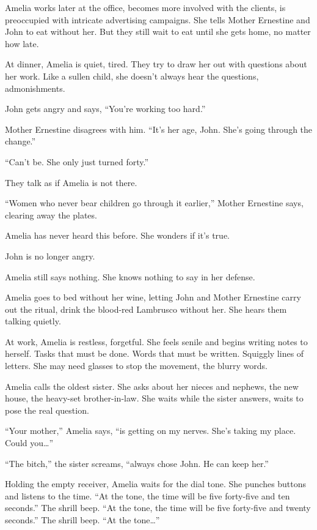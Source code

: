 \documentclass[twoside,10pt]{book}
\begin{document}
Amelia works later at the office, becomes more involved with the
clients, is preoccupied with intricate advertising campaigns. She tells
Mother Ernestine and John to eat without her. But they still wait to eat
until she gets home, no matter how late.

At dinner, Amelia is quiet, tired. They try to draw her out with
questions about her work. Like a sullen child, she doesn't always hear
the questions, admonishments.

John gets angry and says, ``You're working too hard.''

Mother Ernestine disagrees with him. ``It's her age, John. She's going
through the change.''

``Can't be. She only just turned forty.''

They talk as if Amelia is not there.

``Women who never bear children go through it earlier,'' Mother
Ernestine says, clearing away the plates.

Amelia has never heard this before. She wonders if it's true.

John is no longer angry.

Amelia still says nothing. She knows nothing to say in her defense.

Amelia goes to bed without her wine, letting John and Mother Ernestine
carry out the ritual, drink the blood-red Lambrusco without her. She
hears them talking quietly.

At work, Amelia is restless, forgetful. She feels senile and begins
writing notes to herself. Tasks that must be done. Words that must be
written. Squiggly lines of letters. She may need glasses to stop the
movement, the blurry words.

Amelia calls the oldest sister. She asks about her nieces and nephews,
the new house, the heavy-set brother-in-law. She waits while the sister
answers, waits to pose the real question.

``Your mother,'' Amelia says, ``is getting on my nerves. She's taking my
place. Could you\ldots''

``The bitch,'' the sister screams, ``always chose John. He can keep
her.''

Holding the empty receiver, Amelia waits for the dial tone. She punches
buttons and listens to the time. ``At the tone, the time will be five
forty-five and ten seconds.'' The shrill beep. ``At the tone, the time
will be five forty-five and twenty seconds.'' The shrill beep. ``At the
tone\ldots''
\end{document}

